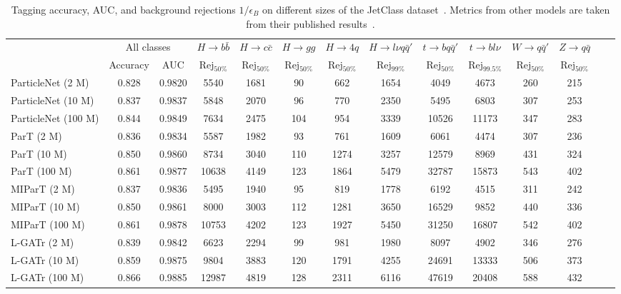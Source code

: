\documentclass[submission, Phys]{SciPost}
\begin{document}
\begin{table}[t]
    \fontsize{8}{8}\selectfont
    \addtolength{\tabcolsep}{-0.35em}
    \centering
    \begin{tabular}{lccccccccccccc}
        \toprule
        & \multicolumn{2}{c}{All classes} & $H \to b\bar{b}$ & $H \to c\bar{c}$ & $H \to gg$ & $H \to 4q$ & $H \to l\nu q\bar{q}'$ & $t \to b q\bar{q}'$ & $t \to b l\nu$ & $W \to q\bar{q}'$ & $Z \to q\bar{q}$ \\        
        & Accuracy & AUC & Rej$_{50\%}$ & Rej$_{50\%}$ & Rej$_{50\%}$ & Rej$_{50\%}$ & Rej$_{99\%}$ & Rej$_{50\%}$ & Rej$_{99.5\%}$ & Rej$_{50\%}$ & Rej$_{50\%}$ \\
        \midrule
        ParticleNet (2 M) & 0.828 & 0.9820 & 5540 & 1681 & 90 & 662 & 1654 & 4049 & 4673 & 260 & 215 \\
        ParticleNet (10 M) & 0.837 & 0.9837 & 5848 & 2070 & 96 & 770 & 2350 & 5495 & 6803 & 307 & 253 \\
        ParticleNet (100 M) & 0.844 & 0.9849 & 7634 & 2475 & 104 & 954 & 3339 & 10526 & 11173 & 347 & 283 \\
        \midrule
        ParT (2 M) & 0.836 & 0.9834 & 5587 & 1982 & 93 & 761 & 1609 & 6061 & 4474 & 307 & 236 \\
        ParT (10 M) & 0.850 & 0.9860 & 8734 & 3040 & 110 & 1274 & 3257 & 12579 & 8969 & 431 & 324 \\
        ParT (100 M) & 0.861 & 0.9877 & 10638 & 4149 & 123 & 1864 & 5479 & 32787 & 15873 & 543 & 402 \\
        \midrule
        MIParT (2 M) & 0.837 & 0.9836 & 5495 & 1940 & 95 & 819 & 1778 & 6192 & 4515 & 311 & 242 \\
        MIParT (10 M) & 0.850 & 0.9861 & 8000 & 3003 & 112 & 1281 & 3650 & 16529 & 9852 & 440 & 336 \\
        MIParT (100 M) & 0.861 & 0.9878 & 10753 & 4202 & 123 & 1927 & 5450 & 31250 & 16807 & 542 & 402 \\
        \midrule
        L-GATr (2 M) & 0.839 & 0.9842 & 6623 & 2294 & 99 & 981 & 1980 & 8097 & 4902 & 346 & 276 \\
        L-GATr (10 M) & 0.859 & 0.9875 & 9804 & 3883 & 120 & 1791 & 4255 & 24691 & 13333 & 506 & 373 \\
        L-GATr (100 M) & 0.866 & 0.9885 & 12987 & 4819 & 128 & 2311 & 6116 & 47619 & 20408 & 588 & 432 \\
        \bottomrule
    \end{tabular}
    \caption{Tagging accuracy, AUC, and background rejections $1/\epsilon_B$ on different sizes of the JetClass dataset~\cite{Qu:2022mxj}. Metrics from other models are taken from their published results~\cite{Qu:2022mxj,Wu:2024thh}.}
    \label{tab:jctaggingfrac}
\end{table}
\end{document}
